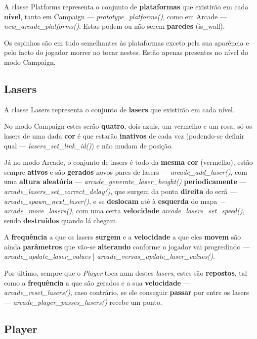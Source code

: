 \documentclass{report}
\begin{document}
A classe Platforms representa o conjunto de \textbf{plataformas} que existirão em cada \textbf{nível}, tanto em Campaign --- \textit{prototype\_platforms()}, como em Arcade --- \textit{new\_arcade\_platforms()}. Estas podem ou não serem \textbf{paredes} (is\_wall).

Os espinhos são em tudo semelhantes às plataformas exceto pela sua aparência e pelo facto do jogador morrer ao tocar nestes. Estão apenas presentes no nível do modo Campaign.

\subsection{Lasers}

A classe Lasers representa o conjunto de \textbf{lasers} que existirão em cada nível. 

No modo Campaign estes serão \textbf{quatro}, dois azuis, um vermelho e um rosa, só os lasers de uma dada \textbf{cor} é que estarão \textbf{inativos} de cada vez (podendo-se definir qual --- \textit{lasers\_set\_link\_id()}) e não mudam de posição.

Já no modo Arcade, o conjunto de lasers é todo da \textbf{mesma cor} (vermelho), estão sempre \textbf{ativos} e são \textbf{gerados} novos pares de lasers --- \textit{arcade\_add\_laser()}, com uma \textbf{altura aleatória} --- \textit{arcade\_generate\_laser\_height()} \textbf{periodicamente} --- \textit{arcade\_lasers\_set\_correct\_delay()}, que surgem da ponta \textbf{direita} do ecrã --- \textit{arcade\_spawn\_next\_laser()}, e se \textbf{deslocam} até à \textbf{esquerda} do mapa --- \textit{arcade\_move\_lasers()}, com uma certa \textbf{velocidade} \textit{arcade\_lasers\_set\_speed()}, sendo \textbf{destruídos} quando lá chegam.

A \textbf{frequência} a que os lasers \textbf{surgem} e a \textbf{velocidade} a que eles \textbf{movem} são ainda \textbf{parâmetros} que vão-se \textbf{alterando} conforme o jogador vai progredindo --- \textit{arcade\_update\_laser\_values} | \textit{arcade\_versus\_update\_laser\_values()}.

Por último, sempre que o \textit{Player} toca num destes \textit{lasers}, estes são \textbf{repostos}, tal como a \textbf{frequência} a que são gerados e a sua \textbf{velocidade} --- \textit{arcade\_reset\_lasers()}, caso contrário, se ele conseguir \textbf{passar} por entre os lasers --- \textit{arcade\_player\_passes\_lasers()} recebe um ponto.

\subsection{Player}
\end{document}

